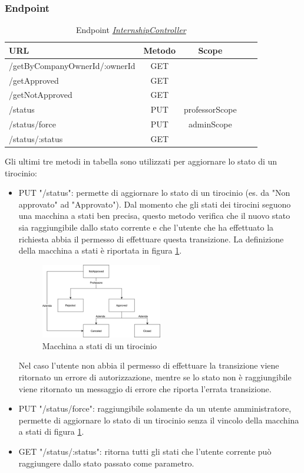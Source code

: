 \subsubsection{Endpoint}
\label{server:internship-controller}
\begin{table}[H]
	\ttfamily
	\caption{Endpoint \hyperref[server:internship-controller]{\textit{InternshipController}}}
	\centering
	\label{table:api:internship-controller}
	\begin{tabular}{l c c c c}    
		URL  & Metodo & Scope \\ 
		\midrule
		/getByCompanyOwnerId/:ownerId & GET    \\
		/getApproved & GET   \\
		/getNotApproved & GET   \\
		/status & PUT & professorScope \\
		/status/force & PUT & adminScope \\
		/status/:status & GET \\
		\bottomrule
	\end{tabular}
\end{table}

Gli ultimi tre metodi in tabella sono utilizzati per aggiornare lo stato di un tirocinio:
\begin{itemize}
	\item PUT "/status": permette di aggiornare lo stato di un tirocinio (es. da "Non approvato" ad "Approvato"). Dal momento che gli stati dei tirocini seguono una macchina a stati ben precisa, questo metodo verifica che il nuovo stato sia raggiungibile dallo stato corrente e che l'utente che ha effettuato la richiesta abbia il permesso di effettuare questa transizione. La definizione della macchina a stati è riportata in figura \ref{fig:internship-state-machine}.
	 \begin{figure}[H] 
		\centering    
		\includegraphics[width=0.5\textwidth]{Chapter4/Figs/internship-state-machine}
		\caption[Macchina a stati di un tirocinio]{Macchina a stati di un tirocinio}
		\label{fig:internship-state-machine}
	\end{figure}
	Nel caso l'utente non abbia il permesso di effettuare la transizione viene ritornato un errore di autorizzazione, mentre se lo stato non è raggiungibile viene ritornato un messaggio di errore che riporta l'errata transizione.
	\item PUT "/status/force": raggiungibile solamente da un utente amministratore, permette di aggiornare lo stato di un tirocinio senza il vincolo della macchina a stati di figura \ref{fig:internship-state-machine}.
	\item GET "/status/:status": ritorna tutti gli stati che l'utente corrente può raggiungere dallo stato passato come parametro.
\end{itemize}

